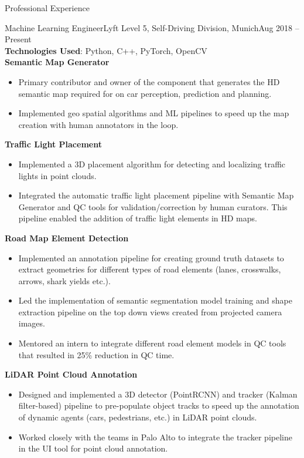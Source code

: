 \documentclass[]{mcdowellcv}
\begin{document}
	
	\makeheader
	
	
	\begin{cvsection}{Professional Experience}
		
		\begin{cvsubsection}{Machine Learning Engineer}{Lyft Level 5, Self-Driving Division, Munich}{Aug 2018 -- Present}   
			\textit{ } \\
			\textbf{Technologies Used}: Python, C++, PyTorch, OpenCV \\
			\textbf{Semantic Map Generator}
			\begin{itemize}
				\item Primary contributor and owner of the component that generates the HD semantic map required for on car perception, prediction and planning.
				\item Implemented geo spatial algorithms and ML pipelines to speed up the map creation with human annotators in the loop.
			\end{itemize}
			
			\textbf{Traffic Light Placement}
			\begin{itemize}
				\item Implemented a 3D placement algorithm for detecting and localizing traffic lights in point clouds.
				\item Integrated the automatic traffic light placement pipeline with Semantic Map Generator and QC tools for validation/correction 
				by human curators. This pipeline enabled the addition of traffic light elements in HD maps.
			\end{itemize}
			
			\textbf{Road Map Element Detection}
			\begin{itemize}
				\item Implemented an annotation pipeline for creating ground truth datasets to extract geometries for different types of road elements (lanes, crosswalks, arrows, shark yields etc.).
				\item Led the implementation of semantic segmentation model training and shape extraction pipeline on the top down views created from projected camera images. 
				\item Mentored an intern to integrate different road element models in QC tools that resulted in 25\% reduction in QC time.
			\end{itemize}
			
			\textbf{LiDAR Point Cloud Annotation}
			\begin{itemize}
				\item Designed and implemented a 3D detector (PointRCNN) and tracker (Kalman filter-based) pipeline to pre-populate object tracks to speed up the annotation of dynamic agents (cars, pedestrians, etc.) in LiDAR point clouds.
				\item Worked closely with the teams in Palo Alto to integrate the tracker pipeline in the UI tool for point cloud annotation.
			\end{itemize}
			

\end{cvsubsection}
\end{cvsection}
\end{document}
